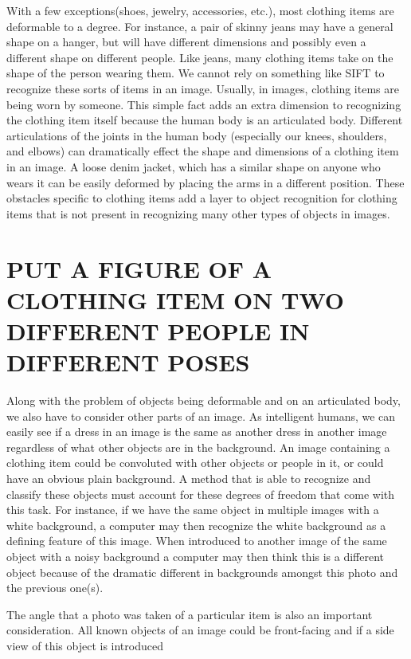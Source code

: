 \documentclass[12pt]{article} %
\begin{document}
	With a few exceptions(shoes, jewelry, accessories, etc.), most clothing items are deformable to a degree. For instance, a pair of skinny jeans may have a general shape on a hanger, but will have different dimensions and possibly even a different shape on different people. Like jeans, many clothing items take on the shape of the person wearing them. We cannot rely on something like SIFT\cite{lowe1999object} to recognize these sorts of items in an image. Usually, in images, clothing items are being worn by someone. This simple fact adds an extra dimension to recognizing the clothing item itself because the human body is an articulated body. Different articulations of the joints in the human body (especially our knees, shoulders, and elbows) can dramatically effect the shape and dimensions of a clothing item in an image. A loose denim jacket, which has a similar shape on anyone who wears it can be easily deformed by placing the arms in a different position. These obstacles specific to clothing items add a layer to object recognition for clothing items that is not present in recognizing many other types of objects in images.

 \section{PUT A FIGURE OF A CLOTHING ITEM ON TWO DIFFERENT PEOPLE IN DIFFERENT POSES}


	Along with the problem of objects being deformable and on an articulated body, we also have to consider other parts of an image. As intelligent humans, we can easily see if a dress in an image is the same as another dress in another image regardless of what other objects are in the background.  An image containing a clothing item could be convoluted with other objects or people in it, or could have an obvious plain background. A method that is able to recognize and classify these objects must account for these degrees of freedom that come with this task. For instance, if we have the same object in multiple images with a white background, a computer may then recognize the white background as a defining feature of this image. When introduced to another image of the same object with a noisy background a computer may then think this is a different object because of the dramatic different in backgrounds amongst this photo and the previous one(s). 

	The angle that a photo was taken of a particular item is also an important consideration. All known objects of an image could be front-facing and if a side view of this object is introduced
 
\end{document}
